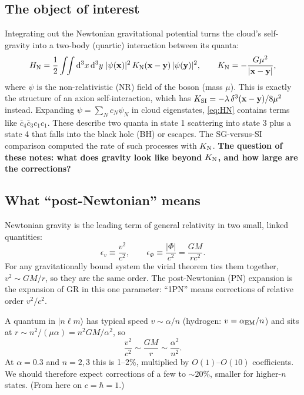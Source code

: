 \documentclass[11pt]{article}
\newcommand{\bx}{\mathbf{x}}\newcommand{\by}{\mathbf{y}}\newcommand{\bv}{\mathbf{v}}
\newcommand{\dd}{\mathrm{d}}
\begin{document}
\subsection{The object of interest}
Integrating out the Newtonian gravitational potential turns the cloud's self-gravity into a two-body (quartic) interaction between its quanta:
\begin{equation}
H_{\rm N}=\frac12\int\!\!\int\dd^3x\,\dd^3y\;|\psi(\bx)|^2\,K_{\rm N}(\bx-\by)\,|\psi(\by)|^2,\qquad K_{\rm N}=-\frac{G\mu^2}{|\bx-\by|},
\label{eq:HN}
\end{equation}
where $\psi$ is the non-relativistic (NR) field of the boson (mass $\mu$). This is exactly the structure of an axion self-interaction, which has $K_{\rm SI}=-\lambda\,\delta^3(\bx-\by)/8\mu^2$ instead. Expanding $\psi=\sum_N c_N\psi_N$ in cloud eigenstates, \eqref{eq:HN} contains terms like $\bar c_4\bar c_3c_1c_1$. These describe two quanta in state 1 scattering into state 3 plus a state 4 that falls into the black hole (BH) or escapes. The SG-versus-SI comparison computed the rate of such processes with $K_{\rm N}$. \textbf{The question of these notes: what does gravity look like beyond $K_{\rm N}$, and how large are the corrections?}

\subsection{What ``post-Newtonian'' means}
Newtonian gravity is the leading term of general relativity in two small, linked quantities:
\[
\epsilon_v\equiv\frac{v^2}{c^2},\qquad \epsilon_\Phi\equiv\frac{|\Phi|}{c^2}=\frac{GM}{rc^2}.
\]
For any gravitationally bound system the virial theorem ties them together, $v^2\sim GM/r$, so they are the same order. The post-Newtonian (PN) expansion is the expansion of GR in this one parameter: ``1PN'' means corrections of relative order $v^2/c^2$.

\begin{idea}
A quantum in $|n\ell m\rangle$ has typical speed $v\sim\alpha/n$ (hydrogen: $v=\alpha_{\rm EM}/n$) and sits at $r\sim n^2/(\mu\alpha)=n^2GM/\alpha^2$, so
\[
\frac{v^2}{c^2}\sim\frac{GM}{r}\sim\frac{\alpha^2}{n^2}.
\]
At $\alpha=0.3$ and $n=2,3$ this is 1--2\%, multiplied by $O(1)$--$O(10)$ coefficients. We should therefore expect corrections of a few to $\sim20\%$, smaller for higher-$n$ states. (From here on $c=\hbar=1$.)
\end{idea}
\end{document}
